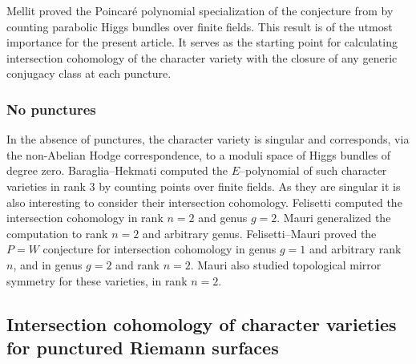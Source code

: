 \documentclass[11pt]{article}
\newcommand{\Subsection}{\subsection}
\theoremstyle{definition}
\theoremstyle{plain}
\begin{document}
Mellit \cite{Mellit2020} proved the Poincaré polynomial specialization of the conjecture from \cite{Hausel_Letellier_Villegas} by counting parabolic Higgs bundles over finite fields. This result is of the utmost importance for the present article. It serves as the starting point for calculating intersection cohomology of the character variety with the closure of any generic conjugacy class at each puncture.

\subsubsection{No punctures}
In the absence of punctures, the character variety is singular and corresponds, via the non-Abelian Hodge correspondence, to a moduli space of Higgs bundles of degree zero. Baraglia--Hekmati \cite{Baraglia_Hekmati} computed the $E$--polynomial of such character varieties in rank $3$ by counting points over finite fields. As they are singular it is also interesting to consider their intersection cohomology. Felisetti \cite{Felisetti_2021} computed the intersection cohomology in rank $n=2$ and genus $g=2$. Mauri \cite{Mauri} generalized the computation to rank $n=2$ and arbitrary genus. Felisetti--Mauri \cite{felisetti_mauri} proved the $P=W$ conjecture for intersection cohomology in genus $g=1$ and arbitrary rank $n$, and in genus $g=2$ and rank $n=2$. Mauri \cite{Mauri2021} also studied topological mirror symmetry for these varieties, in rank $n=2$.

\Subsection{Intersection cohomology of character varieties for punctured Riemann surfaces}
\end{document}
